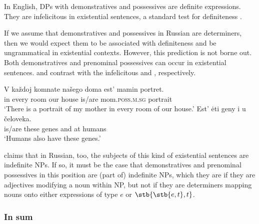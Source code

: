 \documentclass[output=paper,
colorlinks,
citecolor=brown,
newtxmath
]{langscibook}
\begin{document}
In English, DPs with demonstratives and possessives are definite expressions. They are infelicitous in existential sentences, a standard test for definiteness \citep{Milsark1977,Bach1987}.


\ea\label{standard_definiteness}
\z\z 

\noindent If we assume that demonstratives and possessives in Russian are determiners, then we would expect them to be associated with definiteness and be ungrammatical in existential contexts. However, this prediction is not borne out. Both demonstratives and prenominal possessives can occur in existential sentences.  and  contrast with the infelicitous  and , respectively.


\ea 
    \ea\label{32_a} \gll V každoj komnate našego doma est' mamin portret.\\
    in every room our house is/are mom.\textsc{poss.m.sg} portrait\\
    \glt `There is a portrait of my mother in every room of our house.'
    \ex\label{32_b} \gll Est' ėti geny i u čeloveka.\\
    is/are these genes and at humans\\
    \glt `Humans also have these genes.'
\z\z

\noindent \citet{Paduceva2000} claims that in Russian, too, the subjects of this kind of existential sentences are indefinite NPs. If so, it must be the case that demonstratives and prenominal possessives in this position are (part of) indefinite NPs, which they are if they are adjectives modifying a noun within NP, but not if they are determiners mapping nouns onto either expressions of type $e$ or $\stb{\stb{e,t}, t}$.                                             

\subsubsection{In sum}
\end{document}
